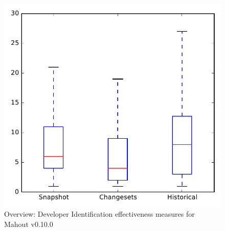 
\begin{figure}
\centering
\includegraphics[height=0.4\textheight]{figures/dit/all_mahout_no_outlier}
\caption{Overview: Developer Identification effectiveness measures for Mahout v0.10.0}
\label{fig:dit:all:mahout}
\end{figure}

